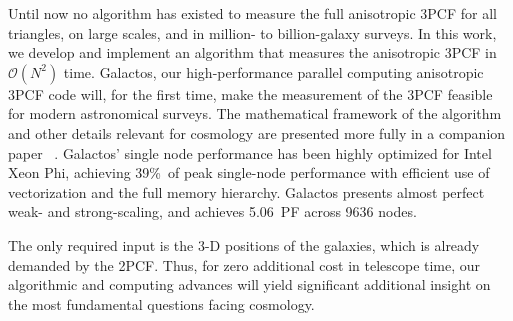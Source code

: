 Until now no algorithm has existed to measure the full anisotropic 3PCF for all triangles, on large scales, and in million- to billion-galaxy surveys. In this work, we develop and implement an algorithm that measures the anisotropic 3PCF in $\mathcal{O}(N^2)$ time. Galactos, our high-performance parallel computing anisotropic 3PCF code will, for the first time, make the measurement of the 3PCF feasible for modern astronomical surveys. The mathematical framework of the algorithm and other details relevant for cosmology are presented more fully in a companion paper ~\cite{SE3ptAniso}.
Galactos' single node performance has been highly optimized for Intel Xeon Phi, achieving 39\%\ of peak single-node performance with efficient use of vectorization and the full memory hierarchy. 
Galactos presents almost perfect weak- and strong-scaling, and achieves 5.06~PF across 9636 nodes.

The only required input is the 3-D positions of the galaxies, which is already demanded by the 2PCF.  Thus, for zero additional cost in telescope time, our algorithmic and computing advances will yield significant additional insight on the most fundamental questions facing cosmology.










